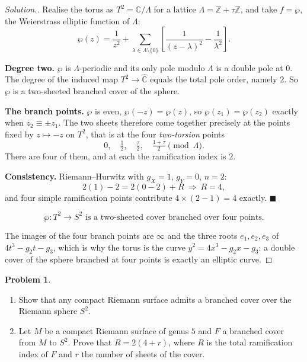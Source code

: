 \documentclass[11pt,a4paper]{article}
\theoremstyle{definition}
\newtheorem{problemx}{Problem}[section]
\newenvironment{problem}{\begin{problemx}}{\end{problemx}}
\newenvironment{solution}
  {\renewcommand{\qedsymbol}{}\begin{proof}[\textit{Solution}.]}
  {\end{proof}}
\begin{document}
\begin{solution}
Realise the torus as $T^{2} = \mathbb{C}/\Lambda$ for a lattice
$\Lambda = \mathbb{Z} + \tau\mathbb{Z}$, and take $f = \wp$, the Weierstrass
elliptic function of $\Lambda$:
$$\wp(z) = \frac{1}{z^{2}}
+ \sum_{\lambda\in\Lambda\setminus\{0\}}
\left[\frac{1}{(z-\lambda)^{2}} - \frac{1}{\lambda^{2}}\right].$$

\textbf{Degree two.} $\wp$ is $\Lambda$-periodic and its only pole modulo
$\Lambda$ is a double pole at $0$. The degree of the induced map
$T^{2} \rightarrow \widehat{\mathbb{C}}$ equals the total pole order, namely $2$.
So $\wp$ is a two-sheeted branched cover of the sphere.

\textbf{The branch points.} $\wp$ is even, $\wp(-z) = \wp(z)$, so $\wp(z_1) = \wp(z_2)$
exactly when $z_2 \equiv \pm z_1$. The two sheets therefore come together precisely
at the points fixed by $z \mapsto -z$ on $T^{2}$, that is at the four
\emph{two-torsion} points
$$0,\quad \tfrac12,\quad \tfrac{\tau}{2},\quad \tfrac{1+\tau}{2}
\pmod{\Lambda}.$$
There are four of them, and at each the ramification index is $2$.

\textbf{Consistency.} Riemann--Hurwitz with $g_X = 1$, $g_Y = 0$, $n = 2$:
$$2(1) - 2 = 2(0-2) + R \ \Longrightarrow\ R = 4 ,$$
and four simple ramification points contribute $4 \times (2-1) = 4$ exactly.
$\blacksquare$

$$\boxed{\wp : T^{2}\rightarrow S^{2} \text{ is a two-sheeted cover branched over
four points.}}$$

The images of the four branch points are $\infty$ and the three roots
$e_1,e_2,e_3$ of $4t^{3}-g_2t-g_3$, which is why the torus is the curve
$y^{2} = 4x^{3}-g_2x-g_3$: a double cover of the sphere branched at four points is
exactly an elliptic curve.
\end{solution}


\begin{problem}
\begin{enumerate}
\item[(a).] Show that any compact Riemann surface admits a branched cover over
the Riemann sphere $S^{2}$.
\item[(b).] Let $M$ be a compact Riemann surface of genus $5$ and $F$ a branched
cover from $M$ to $S^{2}$. Prove that $R = 2(4 + r)$, where $R$ is the total
ramification index of $F$ and $r$ the number of sheets of the cover.
\end{enumerate}
\end{problem}
\end{document}
